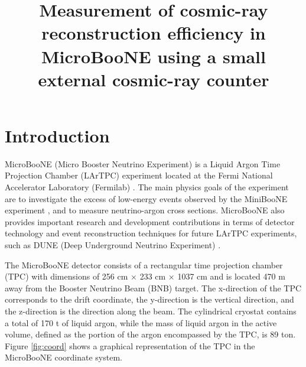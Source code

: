 \documentclass[a4paper,11pt]{article}
\title{\boldmath Measurement of cosmic-ray reconstruction efficiency in MicroBooNE using a small external cosmic-ray counter}
\begin{document}
\maketitle
\flushbottom

\section{Introduction}
\label{sec:intro}
MicroBooNE (Micro Booster Neutrino Experiment) is a Liquid Argon Time Projection Chamber (LArTPC) experiment located at the Fermi National Accelerator Laboratory (Fermilab) \cite{detector}. The main physics goals of the experiment are to investigate the excess of low-energy events observed by the MiniBooNE experiment \cite{miniboone}, and to measure neutrino-argon cross sections. MicroBooNE also provides important research and development contributions in terms of detector technology and event reconstruction techniques for future LArTPC experiments, such as DUNE (Deep Underground Neutrino Experiment) \cite{dune}.

The MicroBooNE detector  consists of a rectangular time projection chamber (TPC) with dimensions of 256 cm $\times$ 233 cm $\times$ 1037 cm and is located 470 m away from the Booster Neutrino Beam (BNB) target. The x-direction of the TPC corresponds to the drift coordinate, the y-direction is the vertical direction, and the z-direction is the direction along the beam. The cylindrical cryostat contains a total of 170 t of liquid argon, while the mass of liquid argon in the active volume, defined as the portion of the argon encompassed by the TPC, is 89 ton. Figure \ref{fig:coord} shows a graphical representation of the TPC in the MicroBooNE coordinate system.
\end{document}
